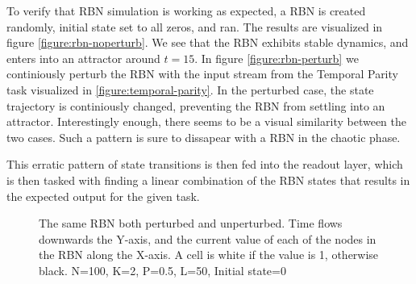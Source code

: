 To verify that RBN simulation is working as expected,
a RBN is created randomly, initial state set to all zeros, and ran.
The results are visualized in figure \ref{figure:rbn-noperturb}.
We see that the RBN exhibits stable dynamics, and enters into an attractor around $t=15$.
In figure \ref{figure:rbn-perturb} we continiously perturb the RBN with the input stream from the Temporal Parity task visualized in \ref{figure:temporal-parity}.
In the perturbed case, the state trajectory is continiously changed, preventing the RBN from settling into an attractor.
Interestingly enough, there seems to be a visual similarity between the two cases.
Such a pattern is sure to dissapear with a RBN in the chaotic phase.

This erratic pattern of state transitions is then fed into the readout layer,
which is then tasked with finding a linear combination of the RBN states that results in the expected output for the given task.

\begin{figure}
  \caption{
    The same RBN both perturbed and unperturbed.
    Time flows downwards the Y-axis,
    and the current value of each of the nodes in the RBN along the X-axis.
    A cell is white if the value is 1, otherwise black.
    N=100, K=2, P=0.5, L=50, Initial state=0
  }
\end{figure}
